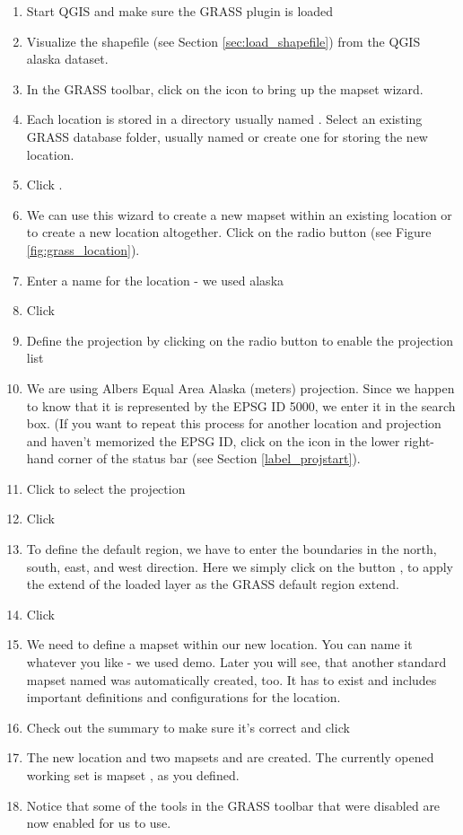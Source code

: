 \begin{enumerate}
  \item Start QGIS and make sure the GRASS plugin is loaded
  \item Visualize the  shapefile (see Section
  \ref{sec:load_shapefile}) from the QGIS alaska dataset.
  \item In the GRASS toolbar, click on the  icon to bring up the mapset wizard.
  \item Each location is stored in a directory usually named
  . Select an existing GRASS database folder, usually
  named  or create one for storing the new location.
  \item Click . 
  \item We can use this wizard to create a new mapset within an existing 
  location or to create a new location altogether. Click on the radio button
   (see Figure \ref{fig:grass_location}).
  \item Enter a name for the location - we used alaska
  \item Click  
  \item Define the projection by clicking on the radio button
   to enable the projection list 
  \item We are using Albers Equal Area Alaska (meters) projection. Since we
  happen to know that it is represented by the EPSG ID 5000, we enter it in
  the search box. (If you want to repeat this process for another location
  and projection and haven't memorized the EPSG ID, click on the
   icon in the lower right-hand
  corner of the status bar (see Section \ref{label_projstart}).
  \item Click  to select the projection
  \item Click  
  \item To define the default region, we have to enter the boundaries in the
  north, south, east, and west direction. Here we simply click on the button
  , to apply the extend of the loaded layer
   as the GRASS default region extend.
  \item Click  
  \item We need to define a mapset within our new location. You can name it
  whatever you like - we used demo. Later you will see, that another standard
  mapset named  was automatically created, too. It has to
  exist and includes important definitions and configurations for the
  location.
  \item Check out the summary to make sure it's correct and click
  \item The new location  and two mapsets 
  and  are created. The currently opened working set is
  mapset , as you defined.
  \item Notice that some of the tools in the GRASS toolbar that were 
  disabled are now enabled for us to use.
\end{enumerate}

